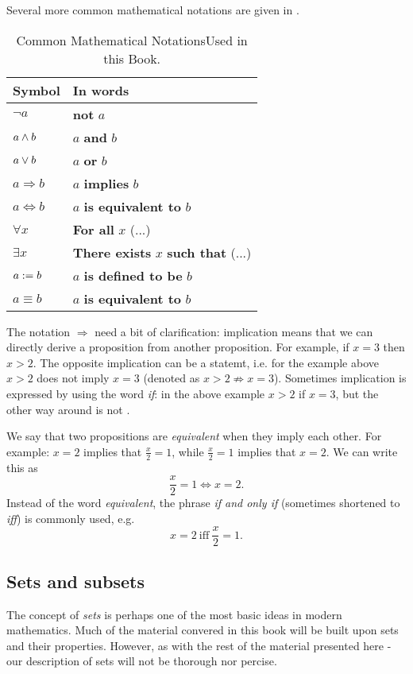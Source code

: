 Several more common mathematical notations are given in .
  
\begin{table}
	\centering
	\caption{Common Mathematical NotationsUsed in this Book.}
	\label{tab:common_math_notations}
	\begin{tabular}{ll}
		\toprule
		Symbol & In words\\
		\midrule
		$\neg a$ & \textbf{not} $a$\\
		$a \wedge b$ & $a$ \textbf{and} $b$\\
		$a \vee b$ & $a$ \textbf{or} $b$\\
		$a \Rightarrow b$ & $a$ \textbf{implies} $b$\\
		$a \Leftrightarrow b$ & $a$ \textbf{is equivalent to} $b$\\
		$\forall x$ & \textbf{For all} $x$ (...)\\
		$\exists x$ & \textbf{There exists} $x$ \textbf{such that} (...)\\
		$a:= b$ & $a$ \textbf{is defined to be} $b$\\
		$a\equiv b$ & $a$ \textbf{is equivalent to} $b$\\
		\midrule
	\end{tabular}
\end{table}

The notation $\Rightarrow$ need a bit of clarification: implication means that we can directly derive a proposition from another proposition. For example, if $x=3$ then $x>2$. The opposite implication can be a \false{} statemt, i.e. for the example above $x>2$ does not imply $x=3$ (denoted as $x>2 \nRightarrow x=3$). Sometimes implication is expressed by using the word \textit{if}: in the above example $x>2$ if $x=3$, but the other way around is not \true{}.

We say that two propositions are \emph{equivalent} when they imply each other. For example: $x=2$ implies that $\frac{x}{2}=1$, while $\frac{x}{2}=1$ implies that $x=2$. We can write this as
\[
	\frac{x}{2}=1 \Leftrightarrow x=2.
\]
Instead of the word \textit{equivalent}, the phrase \textit{if and only if} (sometimes shortened to \emph{iff}) is commonly used, e.g.
\[
	x=2\ \text{iff}\ \frac{x}{2}=1.
\]

\subsection{Sets and subsets}
The concept of \emph{sets} is perhaps one of the most basic ideas in modern mathematics. Much of the material convered in this book will be built upon sets and their properties. However, as with the rest of the material presented here - our description of sets will not be thorough nor percise.

